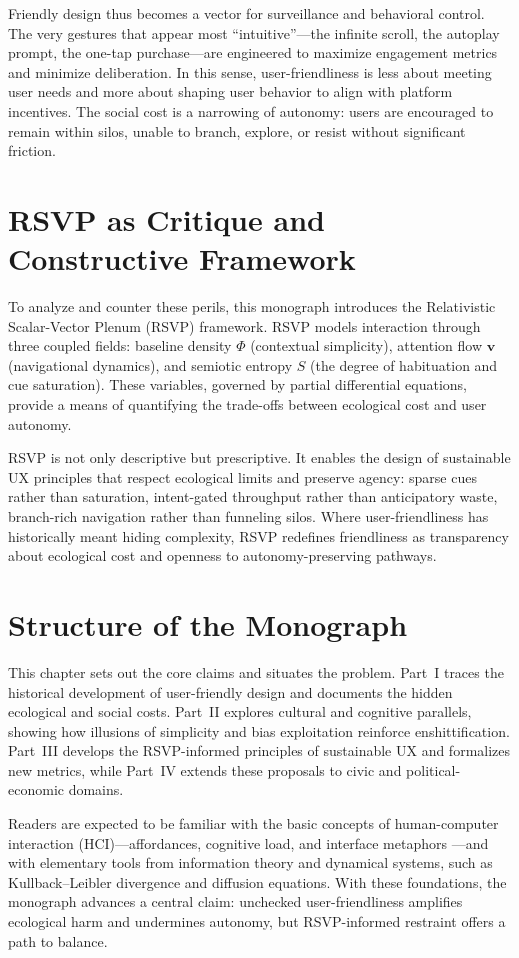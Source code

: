 \documentclass[openany]{book}
\begin{document}
Friendly design thus becomes a vector for surveillance and behavioral control. The very gestures that appear most “intuitive”—the infinite scroll, the autoplay prompt, the one-tap purchase—are engineered to maximize engagement metrics and minimize deliberation. In this sense, user-friendliness is less about meeting user needs and more about shaping user behavior to align with platform incentives. The social cost is a narrowing of autonomy: users are encouraged to remain within silos, unable to branch, explore, or resist without significant friction.

\section{RSVP as Critique and Constructive Framework}
To analyze and counter these perils, this monograph introduces the Relativistic Scalar-Vector Plenum (RSVP) framework. RSVP models interaction through three coupled fields: baseline density $\Phi$ (contextual simplicity), attention flow $\mathbf{v}$ (navigational dynamics), and semiotic entropy $S$ (the degree of habituation and cue saturation). These variables, governed by partial differential equations, provide a means of quantifying the trade-offs between ecological cost and user autonomy.  

RSVP is not only descriptive but prescriptive. It enables the design of sustainable UX principles that respect ecological limits and preserve agency: sparse cues rather than saturation, intent-gated throughput rather than anticipatory waste, branch-rich navigation rather than funneling silos. Where user-friendliness has historically meant hiding complexity, RSVP redefines friendliness as transparency about ecological cost and openness to autonomy-preserving pathways.

\section{Structure of the Monograph}
This chapter sets out the core claims and situates the problem. Part~I traces the historical development of user-friendly design and documents the hidden ecological and social costs. Part~II explores cultural and cognitive parallels, showing how illusions of simplicity and bias exploitation reinforce enshittification. Part~III develops the RSVP-informed principles of sustainable UX and formalizes new metrics, while Part~IV extends these proposals to civic and political-economic domains.  

Readers are expected to be familiar with the basic concepts of human-computer interaction (HCI)—affordances, cognitive load, and interface metaphors \citep{norman1988}—and with elementary tools from information theory and dynamical systems, such as Kullback–Leibler divergence and diffusion equations. With these foundations, the monograph advances a central claim: unchecked user-friendliness amplifies ecological harm and undermines autonomy, but RSVP-informed restraint offers a path to balance.
\end{document}

